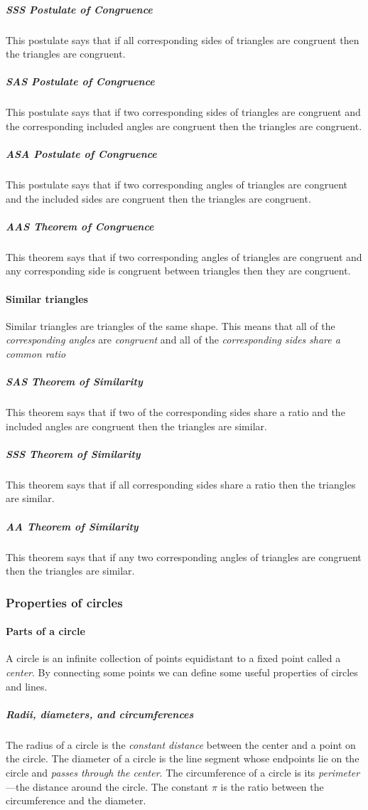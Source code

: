 \subparagraph{SSS Postulate of Congruence}
This postulate says that if all corresponding sides of triangles are congruent then the triangles are congruent.

\subparagraph{SAS Postulate of Congruence}
This postulate says that if two corresponding sides of triangles are congruent and the corresponding included angles are congruent then the triangles are congruent.

\subparagraph{ASA Postulate of Congruence}
This postulate says that if two corresponding angles of triangles are congruent and the included sides are congruent then the triangles are congruent.

\subparagraph{AAS Theorem of Congruence}
This theorem says that if two corresponding angles of triangles are congruent and any corresponding side is congruent between triangles then they are congruent.

\paragraph{Similar triangles}
Similar triangles are triangles of the same shape.
This means that all of the \emph{corresponding angles} are \emph{congruent} and all of the \emph{corresponding sides} \emph{share a common ratio}

\subparagraph{SAS Theorem of Similarity}
This theorem says that if two of the corresponding sides share a ratio and the included angles are congruent then the triangles are similar.

\subparagraph{SSS Theorem of Similarity}
This theorem says that if all corresponding sides share a ratio then the triangles are similar.

\subparagraph{AA Theorem of Similarity}
This theorem says that if any two corresponding angles of triangles are congruent then the triangles are similar.

\subsubsection{Properties of circles}
\paragraph{Parts of a circle}
A circle is an infinite collection of points equidistant to a fixed point called a \emph{center}.
By connecting some points we can define some useful properties of circles and lines.

\subparagraph{Radii, diameters, and circumferences}
The radius of a circle is the \emph{constant distance} between the center and a point on the circle.
The diameter of a circle is the line segment whose endpoints lie on the circle and \emph{passes through the center}.
The circumference of a circle is its \emph{perimeter}---the distance around the circle.
The constant $\pi$ is the ratio between the circumference and the diameter.

